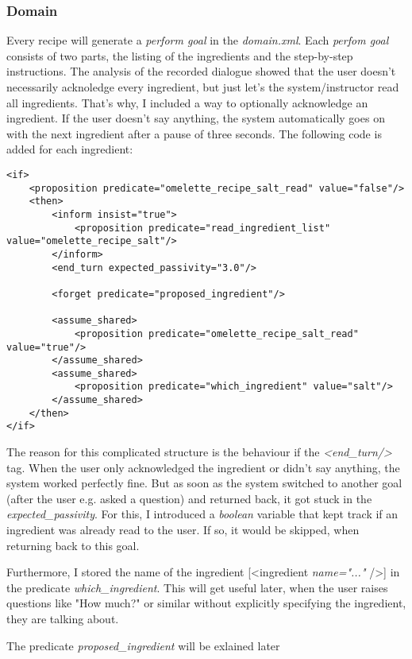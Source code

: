 \documentclass[
	11pt, %
]{fphw}
\begin{document}
\subsubsection*{Domain}
Every recipe will generate a \emph{perform goal} in the \emph{domain.xml}. Each \emph{perfom goal} consists of two parts, the listing of the ingredients and the step-by-step instructions. The analysis of the recorded dialogue showed that the user doesn't necessarily acknoledge every ingredient, but just let's the system/instructor read all ingredients. That's why, I included a way to optionally acknowledge an ingredient. If the user doesn't say anything, the system automatically goes on with the next ingredient after a pause of three seconds. The following code is added for each ingredient:
\begin{lstlisting}[caption={Listing of ingredients},captionpos=b]
<if>
    <proposition predicate="omelette_recipe_salt_read" value="false"/>
    <then>
        <inform insist="true">
            <proposition predicate="read_ingredient_list" value="omelette_recipe_salt"/>
        </inform>
        <end_turn expected_passivity="3.0"/>

        <forget predicate="proposed_ingredient"/>

        <assume_shared>
            <proposition predicate="omelette_recipe_salt_read" value="true"/>
        </assume_shared>
        <assume_shared>
            <proposition predicate="which_ingredient" value="salt"/>
        </assume_shared>
    </then>
</if>
\end{lstlisting}
The reason for this complicated structure is the behaviour if the \emph{<end\_turn/>} tag. When the user only acknowledged the ingredient or didn't say anything, the system worked perfectly fine. But as soon as the system switched to another goal (after the user e.g. asked a question) and returned back, it got stuck in the \emph{expected\_passivity}. For this, I introduced a \emph{boolean} variable that kept track if an ingredient was already read to the user. If so, it would be skipped, when returning back to this goal.

Furthermore, I stored the name of the ingredient [<ingredient \emph{name="..."} />] in the predicate \emph{which\_ingredient}. This will get useful later, when the user raises questions like "How much?" or similar without explicitly specifying the ingredient, they are talking about.

The predicate \emph{proposed\_ingredient} will be exlained later 
\end{document}
